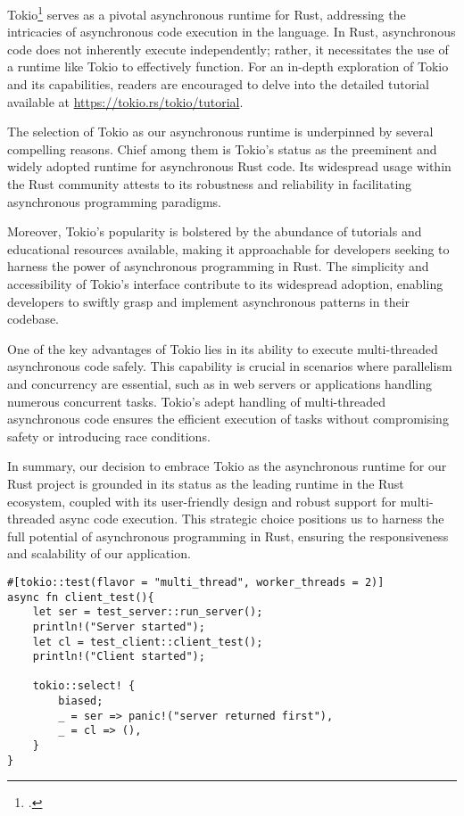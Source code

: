 Tokio\footcite{tokio} serves as a pivotal asynchronous runtime for Rust, addressing the intricacies of asynchronous code execution in the language. In Rust, 
asynchronous code does not inherently execute independently; rather, it necessitates the use of a runtime like Tokio to effectively function. For an in-depth 
exploration of Tokio and its capabilities, readers are encouraged to delve into the detailed tutorial available at 
\href{https://tokio.rs/tokio/tutorial}{https://tokio.rs/tokio/tutorial}.\newline

The selection of Tokio as our asynchronous runtime is underpinned by several compelling reasons. Chief among them is Tokio's status as the preeminent and widely
adopted runtime for asynchronous Rust code. Its widespread usage within the Rust community attests to its robustness and reliability in facilitating asynchronous
programming paradigms.\newline

Moreover, Tokio's popularity is bolstered by the abundance of tutorials and educational resources available, making it approachable for developers seeking to 
harness the power of asynchronous programming in Rust. The simplicity and accessibility of Tokio's interface contribute to its widespread adoption, enabling 
developers to swiftly grasp and implement asynchronous patterns in their codebase.\newline

One of the key advantages of Tokio lies in its ability to execute multi-threaded asynchronous code safely. This capability is crucial in scenarios where 
parallelism and concurrency are essential, such as in web servers or applications handling numerous concurrent tasks. Tokio's adept handling of multi-threaded 
asynchronous code ensures the efficient execution of tasks without compromising safety or introducing race conditions.\newline


In summary, our decision to embrace Tokio as the asynchronous runtime for our Rust project is grounded in its status as the leading runtime in the Rust 
ecosystem, coupled with its user-friendly design and robust support for multi-threaded async code execution. This strategic choice positions us to harness the 
full potential of asynchronous programming in Rust, ensuring the responsiveness and scalability of our application.

\begin{verbatim}
#[tokio::test(flavor = "multi_thread", worker_threads = 2)]
async fn client_test(){ 
    let ser = test_server::run_server();
    println!("Server started");
    let cl = test_client::client_test();
    println!("Client started");

    tokio::select! {
        biased; 
        _ = ser => panic!("server returned first"),
        _ = cl => (),
    }           
}
\end{verbatim}

